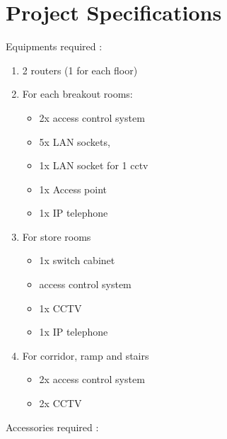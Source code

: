 \documentclass[12pt]{article}
\begin{document}
\section{Project Specifications}
Equipments required :
\begin{enumerate}
    \item 2 routers (1 for each floor)
    \item For each breakout rooms:
    \begin{itemize}
        \item 2x access control system
        \item 5x LAN sockets, 
        \item 1x LAN socket for 1 cctv
        \item 1x Access point
        \item 1x IP telephone
    \end{itemize}
    
    \item For store rooms
    \begin{itemize}
        \item 1x switch cabinet
        \item access control system
        \item 1x CCTV
        \item 1x IP telephone
    \end{itemize}
      
    \item For corridor, ramp and stairs
    \begin{itemize}
        \item 2x access control system
        \item 2x CCTV
    \end{itemize}
\end{enumerate}
Accessories required : 
\end{document}
